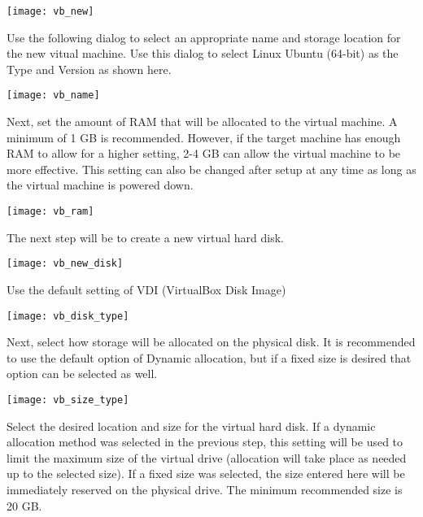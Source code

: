 \documentclass{article}
\begin{document}
\begin{center}
\texttt{[image: vb\_new]}
\end{center}

Use the following dialog to select an appropriate name and storage location for the new vitual machine.  Use this dialog to select Linux Ubuntu (64-bit) as the Type and Version as shown here.

\begin{center}
\texttt{[image: vb\_name]}
\end{center}

Next, set the amount of RAM that will be allocated to the virtual machine.  A minimum of 1 GB is recommended.  However, if the target machine has enough RAM to allow for a higher setting, 2-4 GB can allow the virtual machine to be more effective.  This setting can also be changed after setup at any time as long as the virtual machine is powered down.

\begin{center}
\texttt{[image: vb\_ram]}
\end{center}

The next step will be to create a new virtual hard disk.

\begin{center}
\texttt{[image: vb\_new\_disk]}
\end{center}

Use the default setting of VDI (VirtualBox Disk Image)

\begin{center}
\texttt{[image: vb\_disk\_type]}
\end{center}

Next, select how storage will be allocated on the physical disk.  It is recommended to use the default option of Dynamic allocation, but if a fixed size is desired that option can be selected as well.

\begin{center}
\texttt{[image: vb\_size\_type]}
\end{center}

Select the desired location and size for the virtual hard disk.  If a dynamic allocation method was selected in the previous step, this setting will be used to limit the maximum size of the virtual drive (allocation will take place as needed up to the selected size).  If a fixed size was selected, the size entered here will be immediately reserved on the physical drive.  The minimum recommended size is 20 GB.
\end{document}
